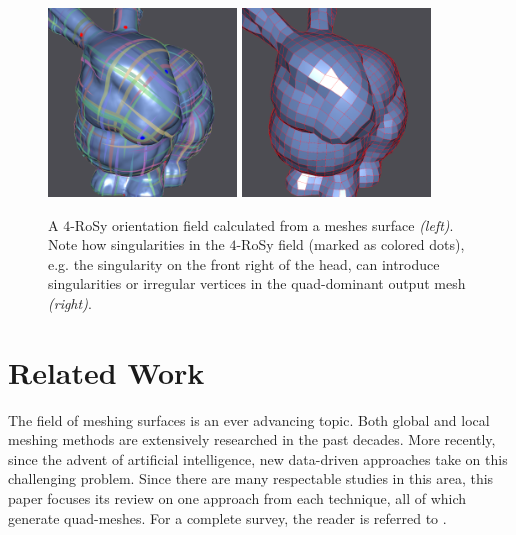 \documentclass{ACGSeminar}
\begin{document}
\begin{figure}[htb!]
	\begin{centering}
		\includegraphics[width=5cm]{img/n-Rosy-orientation.png} \includegraphics[width=5cm]{img/n-Rosy-Mesh.png}\par
	\end{centering}
	\caption{A $4$-RoSy orientation field calculated from a meshes surface \textit{(left)}. Note how singularities in the $4$-RoSy field (marked as colored dots), e.g. the singularity on the front right of the head, can introduce singularities or irregular vertices in the quad-dominant output mesh \textit{(right)}.}
	\label{fig:n-rosy-geometry}
\end{figure}



\section{Related Work}\label{related_work}
The field of meshing surfaces is an ever advancing topic. Both global and local meshing methods are extensively researched in the past decades. More recently, since the advent of artificial intelligence, new data-driven approaches take on this challenging problem. Since there are many respectable studies in this area, this paper focuses its review on one approach from each technique, all of which generate quad-meshes. For a complete survey, the reader is referred to \cite{bommes2013quad}.
\end{document}
